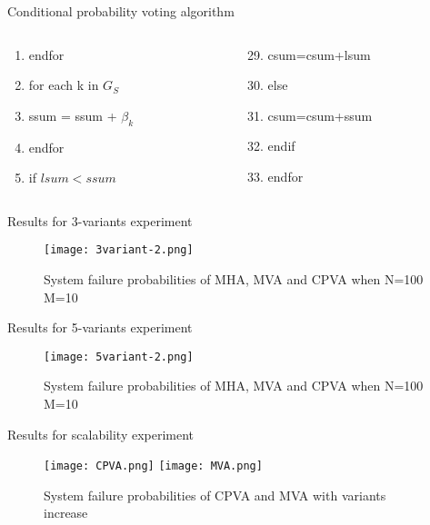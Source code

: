 \documentclass{beamer}
\begin{document}
\begin{frame}{Conditional probability voting algorithm}
\begin{block}{}
\begin{columns}[T]
\begin{column}{.36\textwidth}
\begin{enumerate}
                    \item endfor
                    \item for each k in $G_S$
                    \item ssum = ssum + $\beta_k$
                    \item endfor
                    \item if $lsum < ssum$
                \end{enumerate}
            \end{column}
            \begin{column}{.34\textwidth}
                \begin{enumerate}
                \setcounter{enumi}{28}
                    \item csum=csum+lsum
                    \item else
                    \item csum=csum+ssum
                    \item endif
                    \item endfor
                \end{enumerate}
            \end{column}
        \end{columns}
    \end{block}
\end{frame}
\begin{frame}{Results for 3-variants experiment}
    \begin{figure}[!]
        \centering
        \texttt{[image: 3variant-2.png]}
        \caption{System failure probabilities of MHA, MVA and CPVA when N=100 M=10}
    \end{figure}
\end{frame}
\begin{frame}{Results for 5-variants experiment}
    \begin{figure}[!]
        \centering
        \texttt{[image: 5variant-2.png]}
        \caption{System failure probabilities of MHA, MVA and CPVA when N=100 M=10}
    \end{figure}
\end{frame}
\begin{frame}{Results for scalability experiment}
    \begin{figure}[!]
        \texttt{[image: CPVA.png]}
        \texttt{[image: MVA.png]}
        \caption{System failure probabilities of CPVA and MVA with variants increase}
    \end{figure}
\end{frame}
\end{document}
